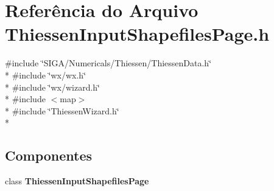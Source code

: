 \section{Referência do Arquivo Thiessen\+Input\+Shapefiles\+Page.\+h}
\label{_thiessen_input_shapefiles_page_8h}
{\ttfamily \#include \char`\"{}S\+I\+G\+A/\+Numericals/\+Thiessen/\+Thiessen\+Data.\+h\char`\"{}}\\*
{\ttfamily \#include \char`\"{}wx/wx.\+h\char`\"{}}\\*
{\ttfamily \#include \char`\"{}wx/wizard.\+h\char`\"{}}\\*
{\ttfamily \#include $<$map$>$}\\*
{\ttfamily \#include \char`\"{}Thiessen\+Wizard.\+h\char`\"{}}\\*
\subsection*{Componentes}
\begin{DoxyCompactItemize}
\item 
class {\bf Thiessen\+Input\+Shapefiles\+Page}
\end{DoxyCompactItemize}
